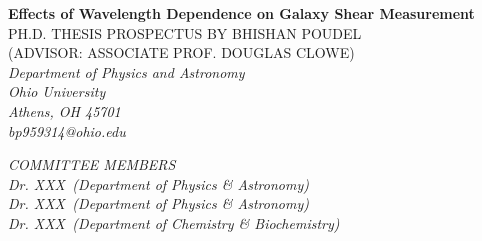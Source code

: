 \thispagestyle{empty}
\begin{center}
\textbf{Effects of Wavelength Dependence on Galaxy Shear Measurement} \\

\vspace{2cm}
PH.D. THESIS PROSPECTUS BY BHISHAN POUDEL \\
(ADVISOR: ASSOCIATE PROF. DOUGLAS CLOWE) \\

\vspace{3cm}
\it{
Department of Physics and Astronomy\\
Ohio University\\
Athens, OH 45701\\
\vspace{2cm}
bp959314@ohio.edu\\
}


\vspace{3cm}
\it{
COMMITTEE MEMBERS\\}
\it{
Dr. XXX\, \hspace{3mm} (Department of Physics \& Astronomy)\\
Dr. XXX\, \hspace{3mm} (Department of Physics \& Astronomy)\\
Dr. XXX\, \hspace{3mm} (Department of Chemistry \& Biochemistry)
}

\end{center}